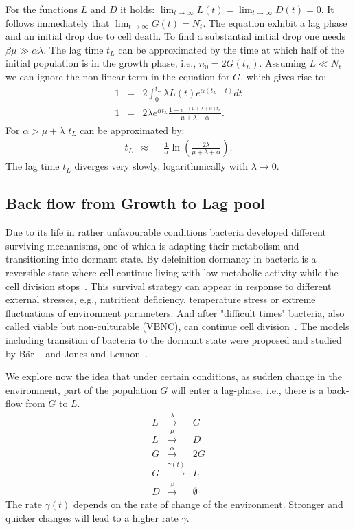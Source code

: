 \documentclass[10pt,A4paper]{article}
\begin{document}
For the functions $L$ and $D$ it holds: $\lim_{t\to\infty} L(t) = \lim_{t\to\infty} D(t) = 0$. 
It follows immediately that $\lim_{t\to\infty} G(t) = N_t$. 
The equation exhibit a lag phase and an initial drop due to cell death. 
To find a substantial initial drop one needs $\beta \mu \gg \alpha \lambda$. 
The lag time $t_L$ can be approximated by the time at which half of the initial population is in the growth phase, i.e., $n_0=2G(t_L)$. 
Assuming $L\ll N_t$ we can ignore the non-linear term in the equation for $G$, which gives rise to:
\begin{eqnarray}
1&=& 2\int_0^{t_L} \lambda L(t)e^{\alpha(t_L-t)}dt\\
1  &=& 2\lambda e^{\alpha t_L}\frac{1-e^{-(\mu+\lambda+\alpha)t_L}}{\mu+\lambda+\alpha}.
\end{eqnarray}
For $\alpha > \mu+\lambda$ $t_L$ can be approximated by:
\begin{eqnarray}
t_L &\approx& -\frac{1}{\alpha}\ln\left(\frac{2\lambda}{\mu+\lambda+\alpha}\right).
\end{eqnarray}
The lag time $t_L$ diverges very slowly, logarithmically with $\lambda\to 0$.

\subsection{Back flow from Growth to Lag pool}

Due to its life in rather unfavourable conditions bacteria developed different surviving mechanisms, one of which is adapting their metabolism and transitioning into dormant state.
By defeinition dormancy in bacteria is a reversible state where cell continue living with low metabolic activity while the cell division stops~\cite{kaprelyants_dormancy_1993}. 
This survival strategy can appear in response to different external stresses, e.g., nutritient deficiency, temperature stress or extreme fluctuations of environment parameters.
And after "difficult times" bacteria, also called viable but non-culturable (VBNC), can continue cell division~\cite{kell_viability_1998}.
The models including transition of bacteria to the dormant state were proposed and studied by Bär \etal~\cite{bar_modelling_2002} and Jones and Lennon~\cite{jones_dormancy_2010}.



We explore now the idea that under certain conditions, as sudden change in the environment, part of the population $G$ will enter a lag-phase, i.e., there is a back-flow from $G$ to $L$. 
\begin{eqnarray}
    L &\stackrel{\lambda}{\longrightarrow} & G\\
    L &\stackrel{\mu}{\longrightarrow} & D\\
    G &\stackrel{\alpha}{\longrightarrow} & 2G\\
    G &\stackrel{\gamma(t)}{\longrightarrow} & L\\
    D &\stackrel{\beta}{\longrightarrow} & \emptyset
\end{eqnarray}
The rate $\gamma(t)$ depends on the rate of change of the environment.
Stronger and quicker changes will lead to a higher rate $\gamma$. 
\end{document}
